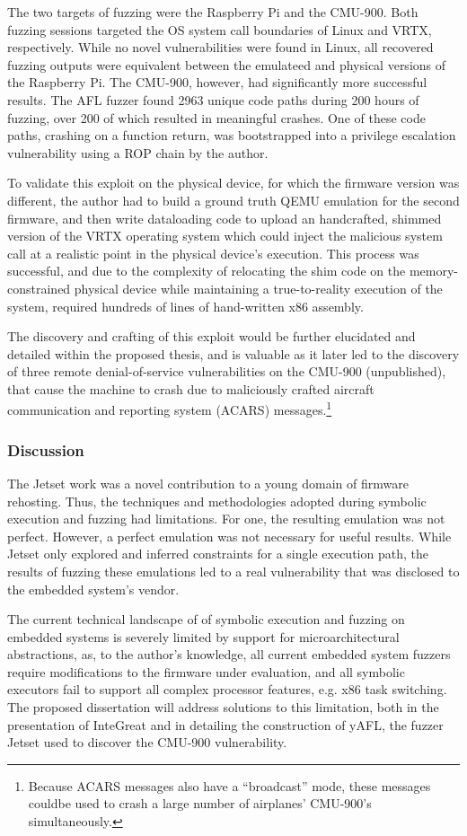 The two targets of fuzzing were the Raspberry Pi and the CMU-900.
Both fuzzing sessions targeted the OS system call boundaries of Linux and VRTX, respectively.
While no novel vulnerabilities were found in Linux, all recovered fuzzing outputs were equivalent between the emulateed and physical versions of the Raspberry Pi.
The CMU-900, however, had significantly more successful results.
The AFL fuzzer found 2963 unique code paths during 200 hours of fuzzing, over 200 of which resulted in meaningful crashes.
One of these code paths, crashing on a function return, was bootstrapped into a privilege escalation vulnerability using a ROP chain by the author.

To validate this exploit on the physical device, for which the firmware version was different, the author had to build a ground truth QEMU emulation for the second firmware, and then write dataloading code to upload an handcrafted, shimmed version of the VRTX operating system which could inject the malicious system call at a realistic point in the physical device's execution.
This process was successful, and due to the complexity of relocating the shim code on the memory-constrained physical device while maintaining a true-to-reality execution of the system, required hundreds of lines of hand-written x86 assembly.

The discovery and crafting of this exploit would be further elucidated and detailed within the proposed thesis, and is valuable as it later led to the discovery of three remote denial-of-service vulnerabilities on the CMU-900 (unpublished), that cause the machine to crash due to maliciously crafted aircraft communication and reporting system (ACARS) messages.\footnote{Because ACARS messages also have a ``broadcast'' mode, these messages couldbe used to crash a large number of airplanes' CMU-900's simultaneously.}

\subsubsection{Discussion}

The Jetset work was a novel contribution to a young domain of firmware rehosting.
Thus, the techniques and methodologies adopted during symbolic execution and fuzzing had limitations. 
For one, the resulting emulation was not perfect.
However, a perfect emulation was not necessary for useful results.
While Jetset only explored and inferred constraints for a single execution path, the results of fuzzing these emulations led to a real vulnerability that was disclosed to the embedded system's vendor.

The current technical landscape of of symbolic execution and fuzzing on embedded systems is severely limited by support for microarchitectural abstractions, as, to the author's knowledge, all current embedded system fuzzers require modifications to the firmware under evaluation, and all symbolic executors fail to support all complex processor features, e.g. x86 task switching.
The proposed dissertation will address solutions to this limitation, both in the presentation of InteGreat and in detailing the construction of yAFL, the fuzzer Jetset used to discover the CMU-900 vulnerability.
